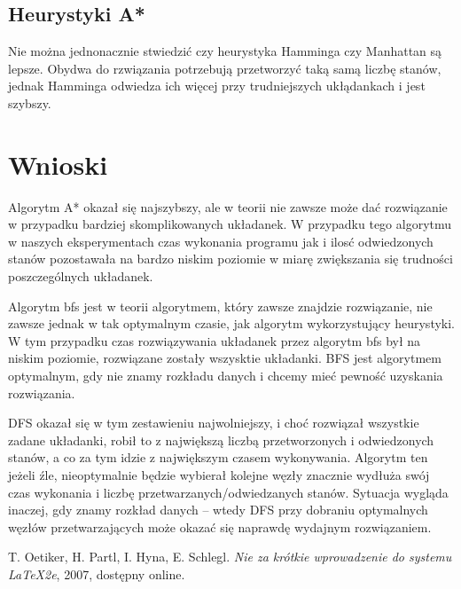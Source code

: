 \documentclass{classrep}
\begin{document}
\subsection{Heurystyki A*}
Nie można jednonacznie stwiedzić czy heurystyka Hamminga czy Manhattan są lepsze.
Obydwa do rzwiązania potrzebują przetworzyć taką samą liczbę stanów, jednak Hamminga odwiedza ich więcej przy trudniejszych ukłądankach i  jest szybszy.

\section{Wnioski}
Algorytm A* okazał się najszybszy, ale w teorii nie zawsze może dać rozwiązanie w przypadku bardziej skomplikowanych układanek. W przypadku tego algorytmu w naszych eksperymentach czas wykonania programu jak i ilosć odwiedzonych stanów pozostawała na bardzo niskim poziomie w miarę zwiększania się trudności poszczególnych układanek. 

Algorytm bfs jest w teorii algorytmem, który zawsze znajdzie rozwiązanie, nie zawsze jednak w tak optymalnym czasie, jak algorytm wykorzystujący heurystyki. W tym przypadku czas rozwiązywania układanek przez algorytm bfs był na niskim poziomie, rozwiązane zostały wszysktie układanki. BFS jest algorytmem optymalnym, gdy nie znamy rozkładu danych i chcemy mieć pewność uzyskania rozwiązania.

DFS okazał się w tym zestawieniu najwolniejszy, i choć rozwiązał wszystkie zadane układanki, robił to z największą liczbą przetworzonych i odwiedzonych stanów, a co za tym idzie z największym czasem wykonywania. Algorytm ten jeżeli źle, nieoptymalnie będzie wybierał kolejne węzły znacznie wydłuża swój czas wykonania i liczbę przetwarzanych/odwiedzanych stanów. Sytuacja wygląda inaczej, gdy znamy rozkład danych – wtedy DFS przy dobraniu optymalnych węzłów przetwarzających może okazać się naprawdę wydajnym rozwiązaniem.
\begin{thebibliography}{0}
   T. Oetiker, H. Partl, I. Hyna, E. Schlegl.
    \textsl{Nie za krótkie wprowadzenie do systemu \LaTeX2e}, 2007, dostępny online.
\end{thebibliography}
\end{document}

